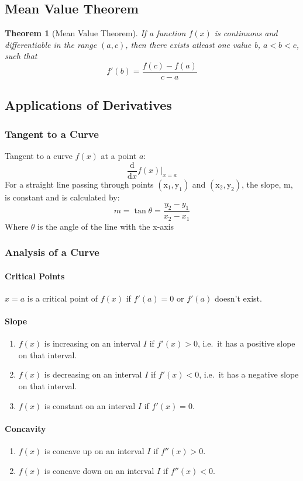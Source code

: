 \documentclass[12pt]{article}
\newcommand{\diff}[1]{\frac{\mathrm{d}}{\mathrm{d}#1}}
\newtheorem{thrm}{Theorem}
\begin{document}
\subsection{Mean Value Theorem}
\begin{thrm}[Mean Value Theorem]
	If a function $f(x)$ is continuous and differentiable in the range $(a,c)$, then there exists atleast one value b, $a < b < c$, such that
	$$f'(b) = \frac{f(c) - f(a)}{c - a}$$
\end{thrm}
\subsection{Applications of Derivatives}
\subsubsection{Tangent to a Curve}
Tangent to a curve $f(x)$ at a point $a$:
$$\diff{x}f(x)\Big\rvert_{x=a}$$
For a straight line passing through points $\mathrm{(x_1,y_1)}$ and  $\mathrm{(x_2, y_2)}$, the slope, m, is constant and is calculated by:
$$m = \tan\theta = \frac{y_2 - y_1}{x_2 - x_1}$$
Where $\theta$ is the angle of the line with the x-axis

\subsubsection{Analysis of a Curve}
\paragraph{Critical Points}
$x = a$ is a critical point of $ f(x) $ if $ f'(a)=0 $ or $ f'(a) $ doesn't exist.
\paragraph{Slope}
\begin{enumerate}
	\item $ f(x) $ is increasing on an interval $I$ if $f'(x) > 0$, i.e.\ it has a positive slope on that interval.
	\item $f(x)$ is decreasing on an interval $I$ if $f'(x) < 0$, i.e.\ it has a negative slope on that interval. 
	\item $f(x)$ is constant on an interval $I$ if $ f'(x) = 0 $.
\end{enumerate}
\paragraph{Concavity}
\begin{enumerate}
	\item $f(x)$ is concave up on an interval $I$ if $ f''(x) > 0 $.
	\item $f(x)$ is concave down on an interval $I$ if $f''(x) < 0 $.
\end{enumerate}
\end{document}
